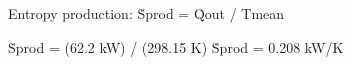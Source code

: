 Entropy production:  
Ṡprod = Q̇out / Tmean  

Ṡprod = (62.2 kW) / (298.15 K)  
Ṡprod = 0.208 kW/K